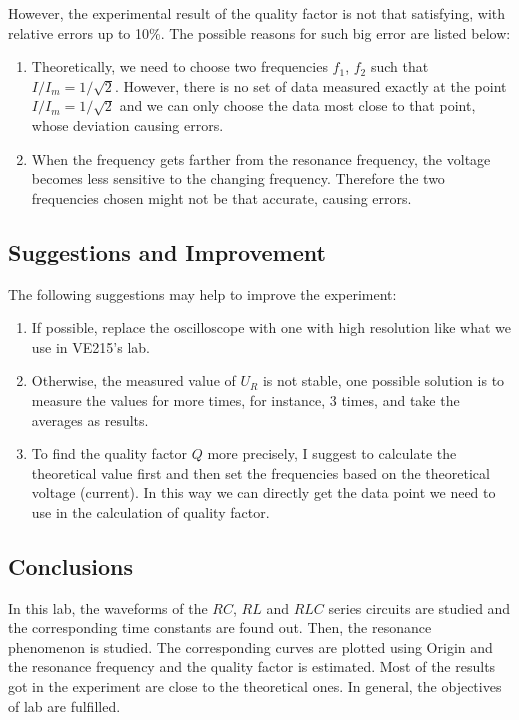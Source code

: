 \documentclass{article}
\begin{document}
However, the experimental result of the quality factor is not that satisfying, with relative errors up to 10\%. The possible reasons for such big error are listed below:
\begin{enumerate}
\item Theoretically, we need to choose two frequencies $f_1$, $f_2$ such that $I/I_m = 1/\sqrt{2}$. However, there is no set of data measured exactly at the point $I/I_m = 1/\sqrt{2}$ and we can only choose the data most close to that point, whose deviation causing errors.
\item When the frequency gets farther from the resonance frequency, the voltage becomes less sensitive to the changing frequency. Therefore the two frequencies chosen might not be that accurate, causing errors.
\end{enumerate}

\subsection{Suggestions and Improvement}

The following suggestions may help to improve the experiment:
\begin{enumerate}
\item If possible, replace the oscilloscope with one with high resolution like what we use in VE215's lab. 
 \item Otherwise, the measured value of $U_R$ is not stable, one possible solution is to measure the values for more times, for instance, 3 times, and take the averages as results.
 \item To find the quality factor $Q$ more precisely, I suggest to calculate the theoretical value first and then set the frequencies based on the theoretical voltage (current). In this way we can directly get the data point we need to use in the calculation of quality factor.
\end{enumerate}

\subsection{Conclusions}

In this lab, the waveforms of the $RC$, $RL$ and $RLC$ series circuits are studied and the corresponding time constants are found out. Then,  the resonance phenomenon is studied. The corresponding curves are plotted using Origin and the resonance frequency and the quality factor is estimated. Most of the results got in the experiment are close to the theoretical ones. In general, the objectives of lab are fulfilled.
\end{document}
